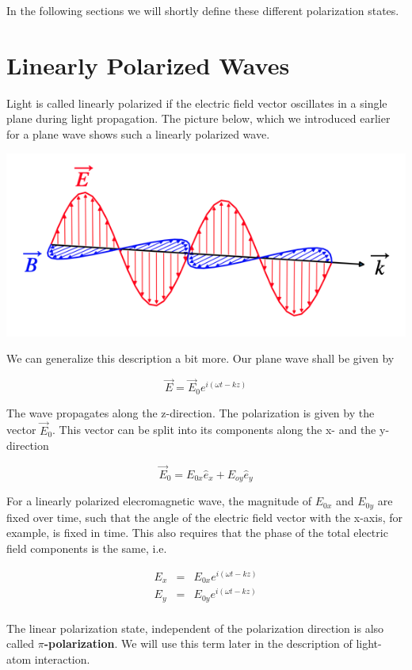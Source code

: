 \documentclass[
  a4paper,
]{book}
\begin{document}
In the following sections we will shortly define these different
polarization states.

\section{Linearly Polarized Waves}\label{linearly-polarized-waves}

Light is called linearly polarized if the electric field vector
oscillates in a single plane during light propagation. The picture
below, which we introduced earlier for a plane wave shows such a
linearly polarized wave.

\includegraphics[width=0.9\linewidth,height=\textheight,keepaspectratio]{electromagnetic-waves/img/plane_wave.png}

We can generalize this description a bit more. Our plane wave shall be
given by

\[
\vec{E}=\vec{E}_0e^{i(\omega t-kz)}
\]

The wave propagates along the z-direction. The polarization is given by
the vector \(\vec{E}_0\). This vector can be split into its components
along the x- and the y-direction

\[
\vec{E}_0=E_{0x}\hat{e}_x+E_{oy}\hat{e}_y
\]

For a linearly polarized elecromagnetic wave, the magnitude of
\(E_{0x}\) and \(E_{0y}\) are fixed over time, such that the angle of
the electric field vector with the x-axis, for example, is fixed in
time. This also requires that the phase of the total electric field
components is the same, i.e.

\begin{eqnarray}
E_{x}&=&E_{0x}e^{i(\omega t-kz)}\\
E_{y}&=&E_{0y}e^{i(\omega t-kz)}\\
\end{eqnarray}

The linear polarization state, independent of the polarization direction
is also called \(\pi\)\textbf{-polarization}. We will use this term
later in the description of light-atom interaction.
\end{document}
